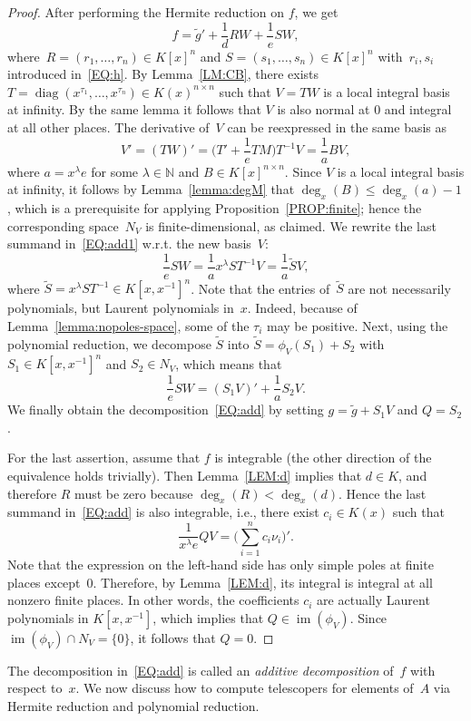 \documentclass[final,1p,times,authoryear]{elsarticle}
\newcommand{\bN}{ {\mathbb N}}
\def\im{\operatorname{im}}
\def\diag{\operatorname{diag}}
\begin{document}
\begin{proof}
After performing the Hermite reduction on $f$, we get
\begin{equation}\label{EQ:add1}
  f = \tilde{g}' + \frac{1}{d} RW + \frac{1}{e} SW,
\end{equation}
where~$R = (r_1, \ldots, r_n)\in K[x]^n$ and $S = (s_1, \ldots, s_n)\in K[x]^n$
with~$r_i, s_i$ introduced in~\eqref{EQ:h}. By Lemma~\ref{LM:CB}, there exists
$T = \diag(x^{\tau_1}, \ldots, x^{\tau_n}) \in K(x)^{n\times n}$ such that $V = TW$
is a local integral basis at infinity. By the same lemma it follows
that $V$ is also normal at $0$ and integral at all other places.
The derivative of~$V$ can be reexpressed in the same basis as
\[
  V' = (TW)' = \biggl(T' + \frac{1}{e}TM\biggr)T^{-1}V = \frac{1}{a}BV,
\]
where $a=x^\lambda e$ for some $\lambda\in \bN$ and $B\in K[x]^{n\times n}$.
Since $V$ is a local integral basis at infinity, it follows by
Lemma~\ref{lemma:degM} that $\deg_x(B) \leq \deg_x(a)-1$, which is a
prerequisite for applying Proposition~\ref{PROP:finite}; hence the
corresponding space~$N_V$ is finite-dimensional, as claimed.
We rewrite the last summand in~\eqref{EQ:add1} w.r.t. the new basis~$V$:
\[
  \frac{1}{e} SW = \frac{1}{a} x^\lambda ST^{-1}V= \frac{1}{a} \tilde{S}V,
\]
where $\tilde{S} = x^\lambda S T^{-1} \in K[x,x^{-1}]^n$. Note that the entries
of~$\tilde{S}$ are not necessarily polynomials, but Laurent polynomials in~$x$.
Indeed, because of Lemma~\ref{lemma:nopoles-space}, some of the $\tau_i$
may be positive. Next, using the polynomial reduction, we decompose
$\tilde{S}$ into $\tilde{S} = \phi_{V}(S_1) + S_2$ with
$S_1\in K[x,x^{-1}]^n$ and $S_2\in N_V$, which means that
\[
  \frac{1}{e} SW = (S_1 V)' + \frac{1}{a} S_2 V.
\]
We finally obtain the decomposition~\eqref{EQ:add} by setting
$g = \tilde{g} + S_1 V$ and $Q = S_2$.

For the last assertion, assume that $f$ is integrable (the other direction of
the equivalence holds trivially). Then Lemma~\ref{LEM:d} implies that $d\in K$,
and therefore $R$ must be zero because $\deg_x(R) < \deg_x(d)$. Hence the last
summand in~\eqref{EQ:add} is also integrable, i.e., there exist $c_i\in K(x)$
such that
\[
  \frac{1}{x^\lambda e} QV = \biggl(\sum_{i=1}^n c_i \nu_i\biggr)'.
\]
Note that the expression on the left-hand side has only simple poles at finite
places except~$0$. Therefore, by Lemma~\ref{LEM:d}, its integral is integral
at all nonzero finite places. In other words, the coefficients $c_i$ are actually
Laurent polynomials in $K[x,x^{-1}]$, which implies that $Q \in \im(\phi_V)$.
Since $\im(\phi_V) \cap N_V = \{0\}$, it follows that $Q=0$.
\end{proof}
The decomposition in~\eqref{EQ:add} is called an \emph{additive decomposition} of~$f$ with respect to~$x$.
We now discuss how to compute telescopers for elements of~$A$ via Hermite reduction and
polynomial reduction.
\end{document}
